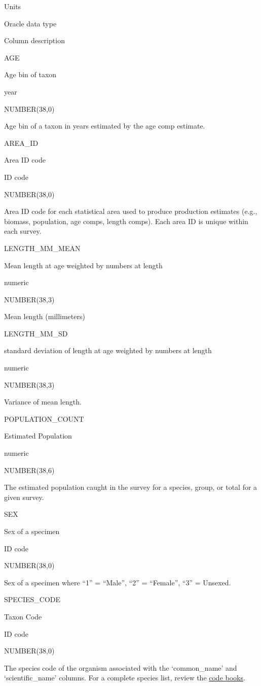 \documentclass[
  letterpaper,
  oneside,
  open=any]{scrbook}
\begin{document}
Units

Oracle data type

Column description

AGE

Age bin of taxon

year

NUMBER(38,0)

Age bin of a taxon in years estimated by the age comp estimate.

AREA\_ID

Area ID code

ID code

NUMBER(38,0)

Area ID code for each statistical area used to produce production
estimates (e.g., biomass, population, age comps, length comps). Each
area ID is unique within each survey.

LENGTH\_MM\_MEAN

Mean length at age weighted by numbers at length

numeric

NUMBER(38,3)

Mean length (millimeters)

LENGTH\_MM\_SD

standard deviation of length at age weighted by numbers at length

numeric

NUMBER(38,3)

Variance of mean length.

POPULATION\_COUNT

Estimated Population

numeric

NUMBER(38,6)

The estimated population caught in the survey for a species, group, or
total for a given survey.

SEX

Sex of a specimen

ID code

NUMBER(38,0)

Sex of a specimen where ``1'' = ``Male'', ``2'' = ``Female'', ``3'' =
Unsexed.

SPECIES\_CODE

Taxon Code

ID code

NUMBER(38,0)

The species code of the organism associated with the `common\_name' and
`scientific\_name' columns. For a complete species list, review the
\href{https://www.fisheries.noaa.gov/resource/document/groundfish-survey-species-code-manual-and-data-codes-manual}{code
books}.
\end{document}
